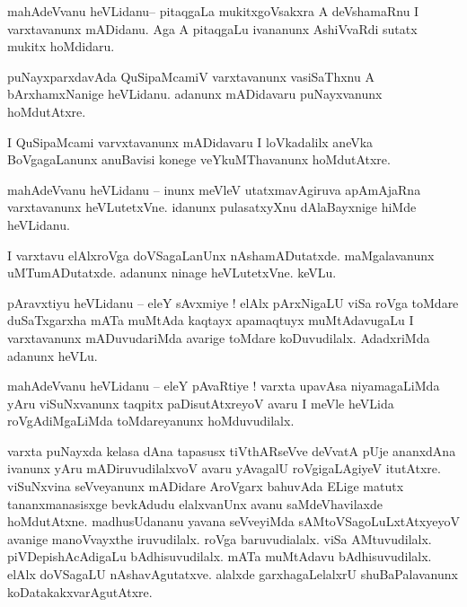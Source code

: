 \documentclass{article}
\begin{document}
\begin{mn}%
mahAdeVvanu heVLidanu-- pitaqgaLa mukitxgoVsakxra A deVshamaRnu I varxtavanunx mADidanu. Aga A 
pitaqgaLu ivananunx AshiVvaRdi sutatx mukitx hoMdidaru.
\end{mn}

\begin{mn}%
puNayxparxdavAda QuSipaMcamiV varxtavanunx vasiSaThxnu A bArxhamxNanige heVLidanu. adanunx 
mADidavaru puNayxvanunx hoMdutAtxre.
\end{mn}

\begin{mn}%
I QuSipaMcami varvxtavanunx mADidavaru I loVkadalilx aneVka BoVgagaLanunx anuBavisi konege 
veYkuMThavanunx hoMdutAtxre.
\end{mn}


\begin{mn}%
mahAdeVvanu heVLidanu -- inunx meVleV utatxmavAgiruva apAmAjaRna varxtavanunx heVLutetxVne. idanunx 
pulasatxyXnu dAlaBayxnige hiMde heVLidanu.
\end{mn}

\begin{mn}%
I varxtavu elAlxroVga doVSagaLanUnx nAshamADutatxde. maMgalavanunx uMTumADutatxde. adanunx ninage 
heVLutetxVne. keVLu.
\end{mn}

\begin{mn}%
pAravxtiyu heVLidanu -- eleY sAvxmiye ! elAlx pArxNigaLU viSa roVga toMdare duSaTxgarxha mATa 
muMtAda kaqtayx apamaqtuyx muMtAdavugaLu I varxtavanunx mADuvudariMda avarige toMdare koDuvudilalx. 
AdadxriMda adanunx heVLu.
\end{mn}

\begin{mn}%
mahAdeVvanu heVLidanu -- eleY pAvaRtiye ! varxta upavAsa niyamagaLiMda yAru viSuNxvanunx taqpitx 
paDisutAtxreyoV avaru I meVle heVLida roVgAdiMgaLiMda toMdareyanunx hoMduvudilalx.
\end{mn}

\begin{mn}%
varxta puNayxda kelasa dAna tapasusx tiVthARseVve deVvatA pUje ananxdAna ivanunx yAru 
mADiruvudilalxvoV avaru yAvagalU roVgigaLAgiyeV itutAtxre. viSuNxvina seVveyanunx mADidare 
AroVgarx bahuvAda ELige matutx tananxmanasisxge bevkAdudu elalxvanUnx avanu saMdeVhavilaxde 
hoMdutAtxne. madhusUdananu yavana seVveyiMda sAMtoVSagoLuLxtAtxyeyoV avanige manoVvayxthe 
iruvudilalx. roVga baruvudialalx. viSa AMtuvudilalx. piVDepishAcAdigaLu bAdhisuvudilalx. mATa 
muMtAdavu bAdhisuvudilalx. elAlx doVSagaLU nAshavAgutatxve. alalxde garxhagaLelalxrU 
shuBaPalavanunx koDatakakxvarAgutAtxre.
\end{mn}
\end{document}
